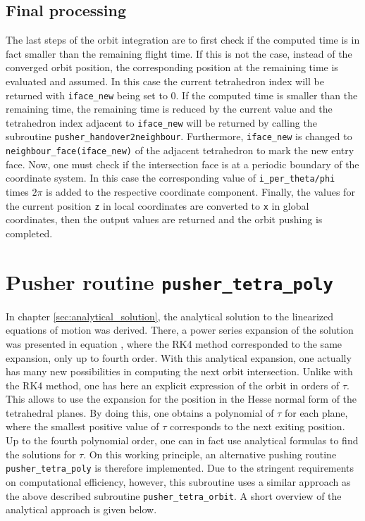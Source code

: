 \documentclass[./main.tex]{subfiles}
\begin{document}
\subsection{Final processing}
The last steps of the orbit integration are to first check if the computed time is in fact smaller than the remaining flight time. If this is not the case, instead of the converged orbit position, the corresponding position at the remaining time is evaluated and assumed. In this case the current tetrahedron index will be returned with \texttt{iface\_new} being set to 0. If the computed time is smaller than the remaining time, the remaining time is reduced by the current value and the tetrahedron index adjacent to \texttt{iface\_new} will be returned by calling the subroutine \texttt{pusher\_handover2neighbour}. Furthermore, \texttt{iface\_new} is changed to \texttt{neighbour\_face(iface\_new)} of the adjacent tetrahedron to mark the new entry face. Now, one must check if the intersection face is at a periodic boundary of the coordinate system. In this case the corresponding value of \texttt{i\_per\_theta/phi} times $2\pi$ is added to the respective coordinate component. Finally, the values for the current position \texttt{z} in local coordinates are converted to \texttt{x} in global coordinates, then the output values are returned and the orbit pushing is completed.

\section{Pusher routine \texttt{pusher\_tetra\_poly}}
\label{sec:AnalyticPusher}
In chapter \ref{sec:analytical_solution}, the analytical solution to the linearized equations of motion was derived. There, a power series expansion of the solution was presented in equation , where the RK4 method corresponded to the same expansion, only up to fourth order. With this analytical expansion, one actually has many new possibilities in computing the next orbit intersection. Unlike with the RK4 method, one has here an explicit expression of the orbit in orders of $\tau$. This allows to use the expansion for the position in the Hesse normal form of the tetrahedral planes. By doing this, one obtains a polynomial of $\tau$ for each plane, where the smallest positive value of $\tau$ corresponds to the next exiting position. Up to the fourth polynomial order, one can in fact use analytical formulas to find the solutions for $\tau$. On this working principle, an alternative pushing routine \texttt{pusher\_tetra\_poly} is therefore implemented. Due to the stringent requirements on computational efficiency, however, this subroutine uses a similar approach as the above described subroutine \texttt{pusher\_tetra\_orbit}. A short overview of the analytical approach is given below.
\end{document}
